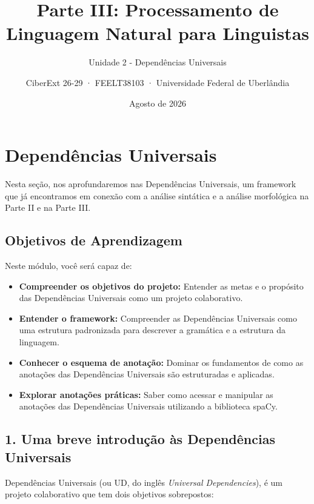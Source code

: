 \documentclass[
  brazilian,
]{article}
\title{Parte III: Processamento de Linguagem Natural para Linguistas}
\subtitle{Unidade 2 - Dependências Universais}
\author{CiberExt 26-29 · FEELT38103 · Universidade Federal de
Uberlândia}
\date{Agosto de 2026}
\providecommand{\tightlist}{%
  \setlength{\itemsep}{0pt}\setlength{\parskip}{0pt}}
\begin{document}
\maketitle

\hypertarget{dependuxeancias-universais}{%
\section{Dependências Universais}\label{dependuxeancias-universais}}

Nesta seção, nos aprofundaremos nas Dependências Universais, um
framework que já encontramos em conexão com a análise sintática e a
análise morfológica na Parte II e na Parte III.

\hypertarget{objetivos-de-aprendizagem}{%
\subsection{Objetivos de Aprendizagem}\label{objetivos-de-aprendizagem}}

Neste módulo, você será capaz de:

\begin{itemize}
\tightlist
\item
  \textbf{Compreender os objetivos do projeto:} Entender as metas e o
  propósito das Dependências Universais como um projeto colaborativo.
\item
  \textbf{Entender o framework:} Compreender as Dependências Universais
  como uma estrutura padronizada para descrever a gramática e a
  estrutura da linguagem.
\item
  \textbf{Conhecer o esquema de anotação:} Dominar os fundamentos de
  como as anotações das Dependências Universais são estruturadas e
  aplicadas.
\item
  \textbf{Explorar anotações práticas:} Saber como acessar e manipular
  as anotações das Dependências Universais utilizando a biblioteca
  spaCy.
\end{itemize}

\hypertarget{uma-breve-introduuxe7uxe3o-uxe0s-dependuxeancias-universais}{%
\subsection{1. Uma breve introdução às Dependências
Universais}\label{uma-breve-introduuxe7uxe3o-uxe0s-dependuxeancias-universais}}

Dependências Universais (ou UD, do inglês \emph{Universal
Dependencies}), é um projeto colaborativo que tem dois objetivos
sobrepostos:
\end{document}
